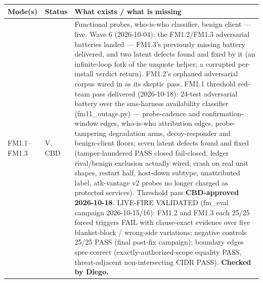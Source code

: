 \small
\begin{longtable}{@{}llp{3.6in}@{}}
    \toprule
    \textbf{Mode(s)} & \textbf{Status} & \textbf{What exists / what is missing} \\
    \midrule
    \endhead
    \bottomrule
    \endfoot
    FM1.1--FM1.3 & V, CBD & Functional probes, who-is-who classifier, benign client --- live. Wave 6 (2026-10-04): the FM1.2/FM1.3 adversarial batteries landed --- FM1.3's previously missing battery delivered, and two latent defects found and fixed by it (an infinite-loop fork of the unquote helper; a corrupted per-install verdict return). FM1.2's orphaned adversarial corpus wired in as its skeptic pass. FM1.1 threshold red-team pass delivered (2026-10-18): 24-test adversarial battery over the sms-harness availability classifier (fm11\_outage.py) --- probe-cadence and confirmation-window edges, who-is-who attribution edges, probe-tampering degradation arms, decoy-responder and benign-client floors; seven latent defects found and fixed (tamper-laundered PASS closed fail-closed, ledger rival/benign exclusion actually wired, crash on real unit shapes, restart half, host-down subtype, unattributed label, atk-vantage v2 probes no longer charged as protected services). Threshold pass \textbf{CBD-approved 2026-10-18}. LIVE-FIRE VALIDATED (fm_eval campaign 2026-10-15/16): FM1.2 and FM1.3 each 25/25 forced triggers FAIL with clause-exact evidence over five blanket-block / wrong-side variations; negative controls 25/25 PASS (final post-fix campaign); boundary edges spec-correct (exactly-authorized-scope equality PASS, threat-adjacent non-intersecting CIDR PASS). \textbf{Checked by Diego.} \\

\end{longtable}
